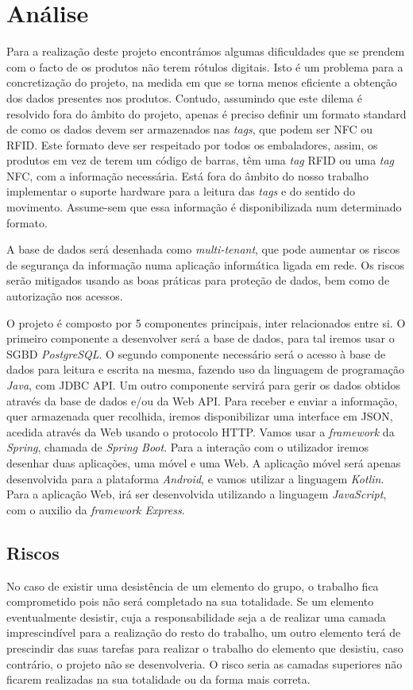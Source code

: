 %
%
\section*{Análise} \label{Analise}

Para a realização deste projeto encontrámos algumas dificuldades que se prendem com o facto de os produtos não terem rótulos digitais. Isto é um problema para a concretização do projeto, na medida em que se torna menos eficiente a obtenção dos dados presentes nos produtos. Contudo, assumindo que este dilema é resolvido fora do âmbito do projeto, apenas é preciso definir um formato standard de como os dados devem ser armazenados nas \textit{tags}, que podem ser NFC ou RFID. Este formato deve ser respeitado por todos os embaladores, assim, os produtos em vez de terem um código de barras, têm uma \textit{tag} RFID ou uma \textit{tag} NFC, com a informação necessária. Está fora do âmbito do nosso trabalho implementar o suporte hardware para a leitura das \textit{tags} e do sentido do movimento. Assume-sem que essa informação é disponibilizada num determinado formato. 

A base de dados será desenhada como \textit{multi-tenant}, que pode aumentar os riscos de segurança da informação numa aplicação informática ligada em rede. Os riscos serão mitigados usando as boas práticas para proteção de dados, bem como de autorização nos acessos.

O projeto é composto por 5 componentes principais, inter relacionados entre si. O primeiro componente a desenvolver será a base de dados, para tal iremos usar o SGBD \textit{PostgreSQL}. O segundo componente necessário será o acesso à base de dados para leitura e escrita na mesma, fazendo uso da linguagem de programação \textit{Java}, com JDBC API. Um outro componente servirá para gerir os dados obtidos através da base de dados e/ou da Web API. Para receber e enviar a informação, quer armazenada quer recolhida, iremos disponibilizar uma interface em JSON, acedida através da Web usando o protocolo HTTP. Vamos usar a \textit{framework} da \textit{Spring}, chamada de \textit{Spring Boot}. Para a interação com o utilizador iremos desenhar duas aplicações, uma móvel e uma Web. A aplicação móvel será apenas desenvolvida para a plataforma \textit{Android}, e vamos utilizar a linguagem \textit{Kotlin}. Para a aplicação Web, irá ser desenvolvida utilizando a linguagem \textit{JavaScript}, com o auxilio da \textit{framework Express}.


\subsection*{Riscos}
No caso de existir uma desistência de um elemento do grupo, o trabalho fica comprometido pois não será completado na sua totalidade. Se um elemento eventualmente desistir, cuja a responsabilidade seja a de realizar uma camada imprescindível para a realização do resto do trabalho, um outro elemento terá de prescindir das suas tarefas para realizar o trabalho do elemento que desistiu, caso contrário, o projeto não se desenvolveria. O risco seria as camadas superiores não ficarem realizadas na sua totalidade ou da forma mais correta.